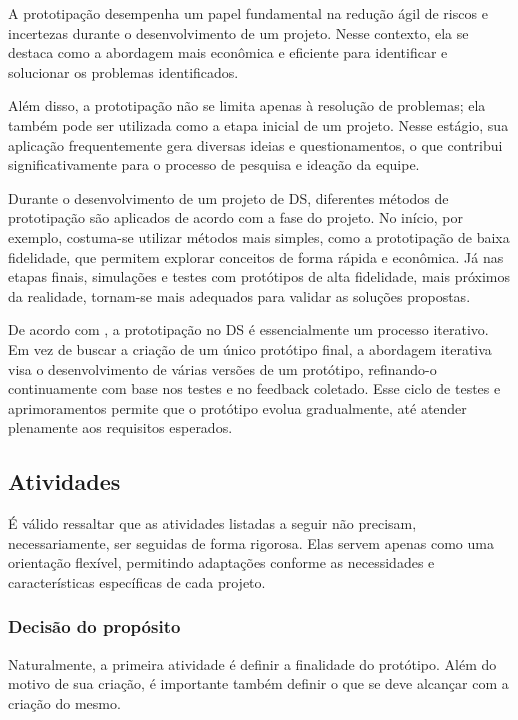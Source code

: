 A prototipação desempenha um papel fundamental na redução ágil de riscos e incertezas durante o desenvolvimento de um projeto. Nesse contexto, ela se destaca como a abordagem mais econômica e eficiente para identificar e solucionar os problemas identificados.

Além disso, a prototipação não se limita apenas à resolução de problemas; ela também pode ser utilizada como a etapa inicial de um projeto. Nesse estágio, sua aplicação frequentemente gera diversas ideias e questionamentos, o que contribui significativamente para o processo de pesquisa e ideação da equipe.

Durante o desenvolvimento de um projeto de DS, diferentes métodos de prototipação são aplicados de acordo com a fase do projeto. No início, por exemplo, costuma-se utilizar métodos mais simples, como a prototipação de baixa fidelidade, que permitem explorar conceitos de forma rápida e econômica. Já nas etapas finais, simulações e testes com protótipos de alta fidelidade, mais próximos da realidade, tornam-se mais adequados para validar as soluções propostas.

De acordo com \cite{Christie2012}, a prototipação no DS é essencialmente um processo iterativo. Em vez de buscar a criação de um único protótipo final, a abordagem iterativa visa o desenvolvimento de várias versões de um protótipo, refinando-o continuamente com base nos testes e no feedback coletado. Esse ciclo de testes e aprimoramentos permite que o protótipo evolua gradualmente, até atender plenamente aos requisitos esperados.

\subsection{Atividades}

É válido ressaltar que as atividades listadas a seguir não precisam, necessariamente, ser seguidas de forma rigorosa. Elas servem apenas como uma orientação flexível, permitindo adaptações conforme as necessidades e características específicas de cada projeto.

\subsubsection{Decisão do propósito}

Naturalmente, a primeira atividade é definir a finalidade do protótipo. Além do motivo de sua criação, é importante também definir o que se deve alcançar com a criação do mesmo.

